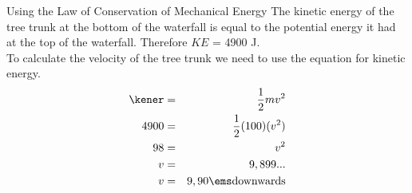\begin{wex}{Using the Law of Conservation of Mechanical Energy}
{
The kinetic energy of the tree trunk at the bottom of the waterfall is equal to the potential energy it had at the top of the waterfall. Therefore $KE$ = 4900 J.\\

To calculate the velocity of the tree trunk we need to use the equation for kinetic energy.
\begin{eqnarray*}
\kener & = & \frac{1}{2}mv^2 \\
4900 &=& \frac{1}{2} (100) (v^2) \\
98 &=& v^2\\
v &=& 9,899...\\
v &=& 9,90 \ems \rm{downwards}
\end{eqnarray*}}
\end{wex}

